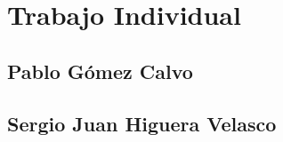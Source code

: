 
\chapter{Trabajo Individual}
\label{cap7}
\label{cap:individual}



\section{Pablo G\'omez Calvo}
\section{Sergio Juan Higuera Velasco}
